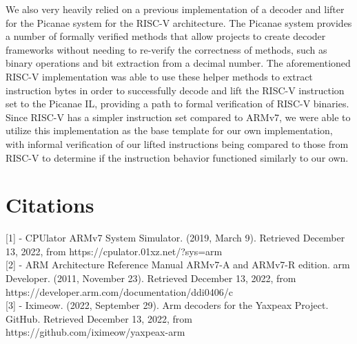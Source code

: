 \documentclass[twocolumn]{article}
\begin{document}
We also very heavily relied on a previous implementation of a decoder and lifter for the Picanae system for the RISC-V architecture. The Picanae system provides a number of formally verified methods that allow projects to create decoder frameworks without needing to re-verify the correctness of methods, such as binary operations and bit extraction from a decimal number. The aforementioned RISC-V implementation was able to use these helper methods to extract instruction bytes in order to successfully decode and lift the RISC-V instruction set to the Picanae IL, providing a path to formal verification of RISC-V binaries. Since RISC-V has a simpler instruction set compared to ARMv7, we were able to utilize this implementation as the base template for our own implementation, with informal verification of our lifted instructions being compared to those from RISC-V to determine if the instruction behavior functioned similarly to our own.

\section*{\centering Citations}
\vspace{0.3cm}

[1] - CPUlator ARMv7 System Simulator. (2019, March 9). Retrieved December 13, 2022, from https://cpulator.01xz.net/?sys=arm\\

[2] - ARM Architecture Reference Manual ARMv7-A and ARMv7-R edition. arm Developer. (2011, November 23). Retrieved December 13, 2022, from https://developer.arm.com/documentation/ddi0406/c\\

[3] - Iximeow. (2022, September 29). Arm decoders for the Yaxpeax Project. GitHub. Retrieved December 13, 2022, from https://github.com/iximeow/yaxpeax-arm
\end{document}
